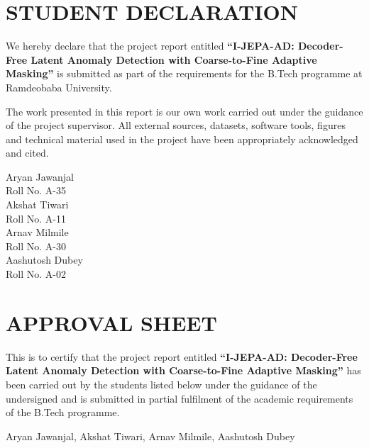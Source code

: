 \documentclass[12pt,a4paper,oneside]{report}
\begin{document}

\chapter*{STUDENT DECLARATION}

We hereby declare that the project report entitled
\textbf{``I-JEPA-AD: Decoder-Free Latent Anomaly Detection with Coarse-to-Fine Adaptive Masking''}
is submitted as part of the requirements for the B.Tech programme at
Ramdeobaba University.

The work presented in this report is our own work carried out under the
guidance of the project supervisor. All external sources, datasets,
software tools, figures and technical material used in the project have
been appropriately acknowledged and cited.

\vspace{1cm}

\begin{flushright}
Aryan Jawanjal\\
Roll No. A-35\\[0.5cm]
Akshat Tiwari\\
Roll No. A-11\\[0.5cm]
Arnav Milmile\\
Roll No. A-30\\[0.5cm]
Aashutosh Dubey\\
Roll No. A-02
\end{flushright}

\chapter*{APPROVAL SHEET}

This is to certify that the project report entitled
\textbf{``I-JEPA-AD: Decoder-Free Latent Anomaly Detection with Coarse-to-Fine Adaptive Masking''}
has been carried out by the students listed below under the guidance of
the undersigned and is submitted in partial fulfilment of the academic
requirements of the B.Tech programme.

\vspace{0.5cm}

Aryan Jawanjal, Akshat Tiwari, Arnav Milmile, Aashutosh Dubey
\end{document}
